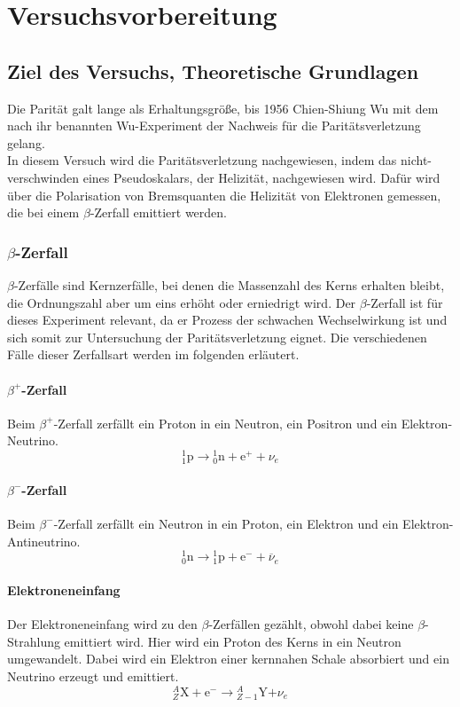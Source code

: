 \chapter{Versuchsvorbereitung}


\section{Ziel des Versuchs, Theoretische Grundlagen}
Die Parität galt lange als Erhaltungsgröße, bis 1956 Chien-Shiung Wu mit dem nach ihr benannten Wu-Experiment der Nachweis für die Paritätsverletzung gelang.\\
In diesem Versuch wird die Paritätsverletzung nachgewiesen, indem das nicht-verschwinden eines Pseudoskalars, der Helizität, nachgewiesen wird. Dafür wird über die Polarisation von Bremsquanten die Helizität von Elektronen gemessen, die bei einem $\beta$-Zerfall emittiert werden. 
\subsection{$\beta$-Zerfall}
$\beta$-Zerfälle sind Kernzerfälle, bei denen die Massenzahl des Kerns erhalten bleibt, die Ordnungszahl aber um eins erhöht oder erniedrigt wird. Der $\beta$-Zerfall ist für dieses Experiment relevant, da er Prozess der schwachen Wechselwirkung ist und sich somit zur Untersuchung der Paritätsverletzung eignet. Die verschiedenen Fälle dieser Zerfallsart werden im folgenden erläutert.
\subsubsection{$\beta^+$-Zerfall}
Beim $\beta^+$-Zerfall zerfällt ein Proton in ein Neutron, ein Positron und ein Elektron-Neutrino.
$${}_{{1}}^{{1}}{\mathrm {p}}\to {}_{{0}}^{{1}}{\mathrm {n}}+{\mathrm {e}}^{{+}}+\nu _{e}$$

\subsubsection{$\beta^-$-Zerfall}
Beim $\beta^-$-Zerfall zerfällt ein Neutron in ein Proton, ein Elektron und ein Elektron-Antineutrino.
$${}_{{0}}^{{1}}{\mathrm {n}}\to {}_{{1}}^{{1}}{\mathrm {p}}+{\mathrm {e}}^{{-}}+\overline {\nu }_{e}$$
\subsubsection{Elektroneneinfang}
Der Elektroneneinfang wird zu den $\beta$-Zerfällen gezählt, obwohl dabei keine $\beta$-Strahlung emittiert wird. Hier wird ein Proton des Kerns in ein Neutron umgewandelt. Dabei wird ein Elektron einer kernnahen Schale absorbiert und ein Neutrino erzeugt und emittiert. 
$${\displaystyle {}_{Z}^{A}\mathrm {X} +\mathrm {e} ^{-}\to {}_{Z-1}^{A}\mathrm {Y} \mathrm {+} \nu _{e}}$$

